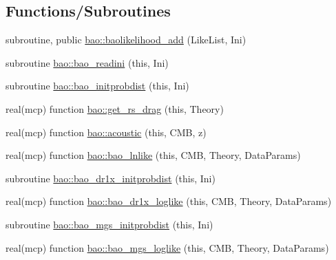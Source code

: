 \subsection*{Functions/\+Subroutines}
\begin{DoxyCompactItemize}
\item 
subroutine, public \mbox{\hyperlink{namespacebao_a1e83b8129197b47271286760d4c11866}{bao\+::baolikelihood\+\_\+add}} (Like\+List, Ini)
\item 
subroutine \mbox{\hyperlink{namespacebao_af2e429eb5aae0de7f70a321537f77861}{bao\+::bao\+\_\+readini}} (this, Ini)
\item 
subroutine \mbox{\hyperlink{namespacebao_a42ad1b0022e37bb1e4457c7a4e329b12}{bao\+::bao\+\_\+initprobdist}} (this, Ini)
\item 
real(mcp) function \mbox{\hyperlink{namespacebao_af2ea26ba323749ae85e04fe46904d115}{bao\+::get\+\_\+rs\+\_\+drag}} (this, Theory)
\item 
real(mcp) function \mbox{\hyperlink{namespacebao_a42575daf8f5c1b68a1a7ddf8bd087988}{bao\+::acoustic}} (this, C\+MB, z)
\item 
real(mcp) function \mbox{\hyperlink{namespacebao_a9a4c24c4606056286bb571c62350ccb3}{bao\+::bao\+\_\+lnlike}} (this, C\+MB, Theory, Data\+Params)
\item 
subroutine \mbox{\hyperlink{namespacebao_a01a1351c073ed9d3a96aece01f8c368b}{bao\+::bao\+\_\+dr1x\+\_\+initprobdist}} (this, Ini)
\item 
real(mcp) function \mbox{\hyperlink{namespacebao_a566724d43b5fe7348c615930295ffefb}{bao\+::bao\+\_\+dr1x\+\_\+loglike}} (this, C\+MB, Theory, Data\+Params)
\item 
subroutine \mbox{\hyperlink{namespacebao_aec7bdc5f03a9da432a0345932d1401bd}{bao\+::bao\+\_\+mgs\+\_\+initprobdist}} (this, Ini)
\item 
real(mcp) function \mbox{\hyperlink{namespacebao_aa39f8163fd5d4a39d7d83bab1a485ee2}{bao\+::bao\+\_\+mgs\+\_\+loglike}} (this, C\+MB, Theory, Data\+Params)
\end{DoxyCompactItemize}
